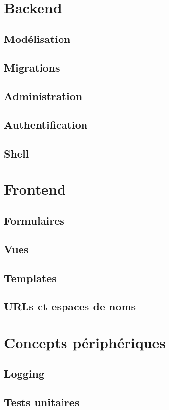 \documentclass[a4paper,12pt]{book}
\begin{document}
\part{Backend}
\chapter{Modélisation}
\chapter{Migrations}
\chapter{Administration}
\chapter{Authentification}
\chapter{Shell}

\part{Frontend}
\chapter{Formulaires}
\chapter{Vues}
\chapter{Templates}
\chapter{URLs et espaces de noms}

\part{Concepts périphériques}
\chapter{Logging}
\chapter{Tests unitaires}
\end{document}
